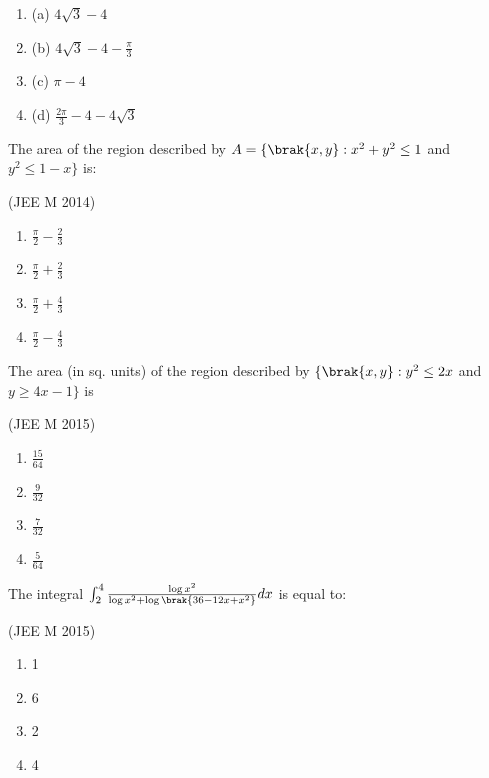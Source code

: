 		\begin{multicols}{2}
			\begin{enumerate}
				\item (a) $4\sqrt{3}-4$
				\item (b) $4\sqrt{3}-4-\frac{\pi}{3}$
				\item (c) $\pi-4$
				\item (d) $\frac{2\pi}{3}-4-4\sqrt{3}$
			\end{enumerate}
		\end{multicols}

	\item The area of the region described by $A=\{\brak{x,y}:x^2+y^2\leq1$ and $y^2\leq1-x\}$ is:

		\hfill{(JEE M 2014)}

		\begin{multicols}{4}
			\begin{enumerate}
				\item $\frac{\pi}{2}-\frac{2}{3}$
				\item $\frac{\pi}{2}+\frac{2}{3}$
				\item $\frac{\pi}{2}+\frac{4}{3}$
				\item $\frac{\pi}{2}-\frac{4}{3}$
			\end{enumerate}
		\end{multicols}

	\item The area (in sq. units) of the region described by $\{\brak{x,y}:y^2\leq2x$ and $y\geq4x-1\}$ is

		\hfill{(JEE M 2015)}

		\begin{multicols}{4}
			\begin{enumerate}
				\item $\frac{15}{64}$
				\item $\frac{9}{32}$
				\item $\frac{7}{32}$
				\item $\frac{5}{64}$
			\end{enumerate}
		\end{multicols}

	\item The integral $\int_2^4\frac{\log x^2}{\log x^2 + \log\brak{36-12x+x^2}}dx$ is equal to:

		\hfill{(JEE M 2015)}

		\begin{multicols}{4}
			\begin{enumerate}
				\item 1
				\item 6
				\item 2
				\item 4
			\end{enumerate}
		\end{multicols}


